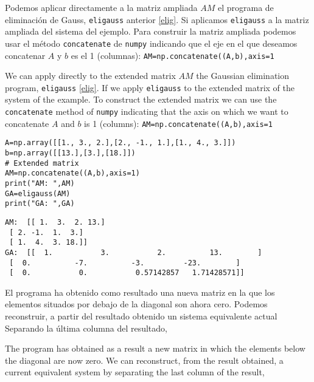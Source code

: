 \begin{paracol}

    
Podemos aplicar directamente a la matriz ampliada $AM$ el programa de eliminación de Gauss, \texttt{eligauss} anterior \ref{elig}. Si aplicamos \texttt{eligauss} a la matriz ampliada del sistema del ejemplo. Para construir la matriz ampliada podemos usar el método \texttt{concatenate} de  \texttt{numpy} indicando que el  eje en el que deseamos concatenar $A$ y $b$ es el 1 (columnas): \texttt{AM=np.concatenate((A,b),axis=1}

\switchcolumn

We can apply directly to the extended matrix $AM$ the Gaussian elimination program, \texttt{eligauss} \ref{elig}. If we apply \texttt{eligauss} to the extended matrix of the system of the example. 
To construct the extended matrix we can use the \texttt{concatenate} method of \texttt{numpy} indicating that the axis on which we want to concatenate $A$ and $b$ is 1 (columns): \texttt{AM=np.concatenate((A,b),axis=1}
\end{paracol}

\begin{verbatim}
A=np.array([[1., 3., 2.],[2., -1., 1.],[1., 4., 3.]])
b=np.array([[13.],[3.],[18.]])
# Extended matrix
AM=np.concatenate((A,b),axis=1)
print("AM: ",AM)
GA=eligauss(AM)
print("GA: ",GA)    
\end{verbatim}

\begin{verbatim}
AM:  [[ 1.  3.  2. 13.]
 [ 2. -1.  1.  3.]
 [ 1.  4.  3. 18.]]
GA:  [[  1.           3.           2.          13.        ]
 [  0.          -7.          -3.         -23.        ]
 [  0.           0.           0.57142857   1.71428571]]   
\end{verbatim}

\begin{paracol}{2}
El programa ha obtenido como resultado una nueva matriz en la que los elementos situados por debajo de la diagonal son ahora cero. Podemos reconstruir, a partir del resultado obtenido un sistema equivalente actual Separando la última columna del resultado,

\switchcolumn
The program has obtained as a result a new matrix in which the elements below the diagonal are now zero. We can reconstruct, from the result obtained, a current equivalent system by separating the last column of the result,
\end{paracol}

